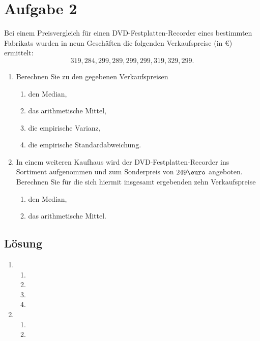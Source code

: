 \documentclass{exercise}
\begin{document}
    \section*{Aufgabe 2}

    \begin{problem}
        Bei einem Preisvergleich für einen DVD-Festplatten-Recorder eines bestimmten Fabrikats wurden in neun Geschäften die folgenden Verkaufspreise (in \euro) ermittelt:
        \[
            319, 284, 299, 289, 299, 299, 319, 329, 299.
        \]
        \begin{enumerate}
            \item Berechnen Sie zu den gegebenen Verkaufspreisen
            \begin{enumerate}
                \item den Median,
                \item das arithmetische Mittel,
                \item die empirische Varianz,
                \item die empirische Standardabweichung.
            \end{enumerate}
            \item In einem weiteren Kaufhaus wird der DVD-Festplatten-Recorder ins Sortiment aufgenommen und zum Sonderpreis von \(249\text{\euro}\) angeboten.
            Berechnen Sie für die sich hiermit insgesamt ergebenden zehn Verkaufspreise
            \begin{enumerate}
                \item den Median,
                \item das arithmetische Mittel. 
            \end{enumerate}
        \end{enumerate}
    \end{problem}

    \subsection*{Lösung}
    \begin{enumerate}
        \item
        \begin{enumerate}
            \item 
            \item 
            \item 
            \item 
        \end{enumerate}
        \item
        \begin{enumerate}
            \item 
            \item 
        \end{enumerate}
    \end{enumerate}
\end{document}
